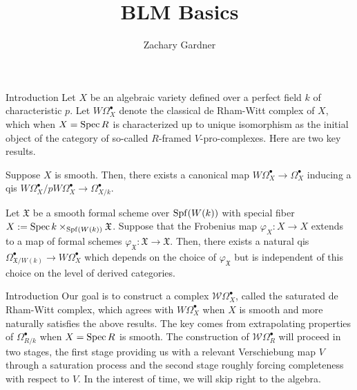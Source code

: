 \documentclass[aspectratio=1610]{beamer}
\title{BLM Basics}
\author{Zachary Gardner}
\date{}
\newcommand{\W}{\mathcal{W}}
\newcommand{\X}{\mathfrak{X}}
\renewcommand{\phi}{\varphi}
\begin{document}
\begin{frame}
\titlepage
\end{frame}

\begin{frame}{Introduction}
Let $X$ be an algebraic variety defined over a perfect field $k$ of characteristic $p$. Let $W\Omega_X^{\bullet}$ denote the classical de Rham-Witt complex of $X$, which when $X=\operatorname{Spec} R$ is characterized up to unique isomorphism as the initial object of the category of so-called $R$-framed $V$-pro-complexes. Here are two key results.

\begin{theorem}
Suppose $X$ is smooth. Then, there exists a canonical map $W\Omega_X^{\bullet}\to\Omega_X^{\bullet}$ inducing a qis $W\Omega_X^{\bullet}/pW\Omega_X^{\bullet}\to\Omega_{X/k}^{\bullet}$.
\end{theorem}

\begin{theorem}
Let $\X$ be a smooth formal scheme over $\operatorname{Spf}(W(k))$ with special fiber $X:=\Spec k\times_{\Spf(W(k))}\X$. Suppose that the Frobenius map $\phi_X: X\to X$ extends to a map of formal schemes $\phi_{\X}: \X\to\X$. Then, there exists a natural qis $\Omega_{\X/W(k)}^{\bullet}\to W\Omega_X^{\bullet}$ which depends on the choice of $\phi_{\X}$ but is independent of this choice on the level of derived categories.
\end{theorem}
\end{frame}

\begin{frame}{Introduction}
Our goal is to construct a complex $\W\Omega_X^{\bullet}$, called the saturated de Rham-Witt complex, which agrees with $W\Omega_X^{\bullet}$ when $X$ is smooth and more naturally satisfies the above results. The key comes from extrapolating properties of $\Omega_{R/k}^{\bullet}$ when $X=\operatorname{Spec} R$ is smooth. The construction of $\W\Omega_R^{\bullet}$ will proceed in two stages, the first stage providing us with a relevant Verschiebung map $V$ through a saturation process and the second stage roughly forcing completeness with respect to $V$. In the interest of time, we will skip right to the algebra.
\end{frame}
\end{document}
